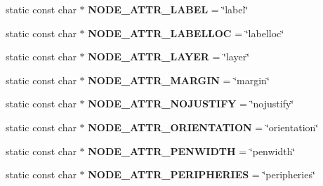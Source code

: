 \begin{DoxyCompactItemize}
\item 
static const char $\ast$ {\bfseries N\+O\+D\+E\+\_\+\+A\+T\+T\+R\+\_\+\+L\+A\+B\+EL} = \char`\"{}label\char`\"{}\hypertarget{classmemgraph_1_1_graphviz_attrs_a096d2ad470cce6973550cbe01c89ba54}{}\label{classmemgraph_1_1_graphviz_attrs_a096d2ad470cce6973550cbe01c89ba54}

\item 
static const char $\ast$ {\bfseries N\+O\+D\+E\+\_\+\+A\+T\+T\+R\+\_\+\+L\+A\+B\+E\+L\+L\+OC} = \char`\"{}labelloc\char`\"{}\hypertarget{classmemgraph_1_1_graphviz_attrs_a887722ebed0a2dee47ec162eb09a03f0}{}\label{classmemgraph_1_1_graphviz_attrs_a887722ebed0a2dee47ec162eb09a03f0}

\item 
static const char $\ast$ {\bfseries N\+O\+D\+E\+\_\+\+A\+T\+T\+R\+\_\+\+L\+A\+Y\+ER} = \char`\"{}layer\char`\"{}\hypertarget{classmemgraph_1_1_graphviz_attrs_a4ce0a4107ad98f2483f0c29403a1d3ec}{}\label{classmemgraph_1_1_graphviz_attrs_a4ce0a4107ad98f2483f0c29403a1d3ec}

\item 
static const char $\ast$ {\bfseries N\+O\+D\+E\+\_\+\+A\+T\+T\+R\+\_\+\+M\+A\+R\+G\+IN} = \char`\"{}margin\char`\"{}\hypertarget{classmemgraph_1_1_graphviz_attrs_a4455fdb389a1909fd92f6efece8c4362}{}\label{classmemgraph_1_1_graphviz_attrs_a4455fdb389a1909fd92f6efece8c4362}

\item 
static const char $\ast$ {\bfseries N\+O\+D\+E\+\_\+\+A\+T\+T\+R\+\_\+\+N\+O\+J\+U\+S\+T\+I\+FY} = \char`\"{}nojustify\char`\"{}\hypertarget{classmemgraph_1_1_graphviz_attrs_a8279aeb7530ea0d40b621b7bd486710a}{}\label{classmemgraph_1_1_graphviz_attrs_a8279aeb7530ea0d40b621b7bd486710a}

\item 
static const char $\ast$ {\bfseries N\+O\+D\+E\+\_\+\+A\+T\+T\+R\+\_\+\+O\+R\+I\+E\+N\+T\+A\+T\+I\+ON} = \char`\"{}orientation\char`\"{}\hypertarget{classmemgraph_1_1_graphviz_attrs_a818cf692622c0f6756f228c44d2c742b}{}\label{classmemgraph_1_1_graphviz_attrs_a818cf692622c0f6756f228c44d2c742b}

\item 
static const char $\ast$ {\bfseries N\+O\+D\+E\+\_\+\+A\+T\+T\+R\+\_\+\+P\+E\+N\+W\+I\+D\+TH} = \char`\"{}penwidth\char`\"{}\hypertarget{classmemgraph_1_1_graphviz_attrs_aff707b7105b4607588d11061c6f68fb3}{}\label{classmemgraph_1_1_graphviz_attrs_aff707b7105b4607588d11061c6f68fb3}

\item 
static const char $\ast$ {\bfseries N\+O\+D\+E\+\_\+\+A\+T\+T\+R\+\_\+\+P\+E\+R\+I\+P\+H\+E\+R\+I\+ES} = \char`\"{}peripheries\char`\"{}\hypertarget{classmemgraph_1_1_graphviz_attrs_a387f0836933e44f6ff132a057a1bbfea}{}\label{classmemgraph_1_1_graphviz_attrs_a387f0836933e44f6ff132a057a1bbfea}


\end{DoxyCompactItemize}
